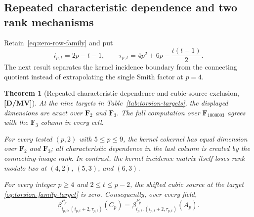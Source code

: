 \documentclass[11pt]{article}
\newtheorem{theorem}{Theorem}[section]
\theoremstyle{definition}
\theoremstyle{remark}
\begin{document}
\subsection{Repeated characteristic dependence and two rank mechanisms}

Retain~\eqref{eq:zero-row-family} and put
\begin{equation}
i_{p,t}=2p-t-1,\qquad
\tau_{p,t}=4p^2+6p-\frac{t(t-1)}2.
\label{eq:torsion-family-target}
\end{equation}
The next result separates the kernel incidence boundary from the connecting quotient instead of
extrapolating the single Smith factor at $p=4$.

\begin{theorem}[Repeated characteristic dependence and cubic-source exclusion, {\bf[D/MV]}]
\label{thm:repeated-characteristic}
At the nine targets in Table~\ref{tab:torsion-targets}, the displayed dimensions are exact over
$\mathbf F_2$ and $\mathbf F_3$. The full computation over $\mathbf F_{1000003}$ agrees with the
$\mathbf F_3$ column in every cell.

For every tested $(p,2)$ with $5\le p\le9$, the kernel cokernel has equal dimension over
$\mathbf F_2$ and $\mathbf F_3$; all characteristic dependence in the last column is created by
the connecting-image rank. In contrast, the kernel incidence matrix itself loses rank modulo two
at $(4,2)$, $(5,3)$, and $(6,3)$.

For every integer $p\ge4$ and $2\le t\le p-2$, the shifted cubic source at the target
\eqref{eq:torsion-family-target} is zero. Consequently, over every field,
\begin{equation}
\beta_{i_{p,t},(i_{p,t}+2,\tau_{p,t})}^{P_p}(C_p)
=\beta_{i_{p,t},(i_{p,t}+2,\tau_{p,t})}^{P_p}(A_p).
\label{eq:cubic-family-transfer}
\end{equation}
\end{theorem}
\end{document}
